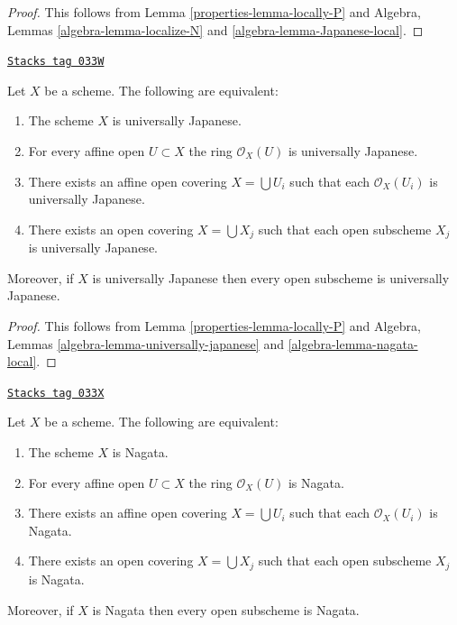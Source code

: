 \begin{proof}

This follows from Lemma \ref{properties-lemma-locally-P} and
Algebra, Lemmas \ref{algebra-lemma-localize-N} and
\ref{algebra-lemma-Japanese-local}.
\end{proof}

\begin{lemma}
\label{properties-lemma-locally-universally-Japanese}
\href{https://stacks.math.columbia.edu/tag/033W}{\texttt{Stacks tag 033W}}

Let $X$ be a scheme. The following are equivalent:
\begin{enumerate}
\item The scheme $X$ is universally Japanese.
\item For every affine open $U \subset X$ the ring $\mathcal{O}_X(U)$
is universally Japanese.
\item There exists an affine open covering $X = \bigcup U_i$
such that each $\mathcal{O}_X(U_i)$ is universally Japanese.
\item There exists an open covering $X = \bigcup X_j$
such that each open subscheme $X_j$ is universally Japanese.
\end{enumerate}
Moreover, if $X$ is universally Japanese then every open subscheme
is universally Japanese.
\end{lemma}

\begin{proof}

This follows from Lemma \ref{properties-lemma-locally-P} and
Algebra, Lemmas \ref{algebra-lemma-universally-japanese} and
\ref{algebra-lemma-nagata-local}.
\end{proof}

\begin{lemma}
\label{properties-lemma-locally-nagata}
\href{https://stacks.math.columbia.edu/tag/033X}{\texttt{Stacks tag 033X}}

Let $X$ be a scheme. The following are equivalent:
\begin{enumerate}
\item The scheme $X$ is Nagata.
\item For every affine open $U \subset X$ the ring $\mathcal{O}_X(U)$
is Nagata.
\item There exists an affine open covering $X = \bigcup U_i$
such that each $\mathcal{O}_X(U_i)$ is Nagata.
\item There exists an open covering $X = \bigcup X_j$
such that each open subscheme $X_j$ is Nagata.
\end{enumerate}
Moreover, if $X$ is Nagata then every open subscheme is Nagata.
\end{lemma}

